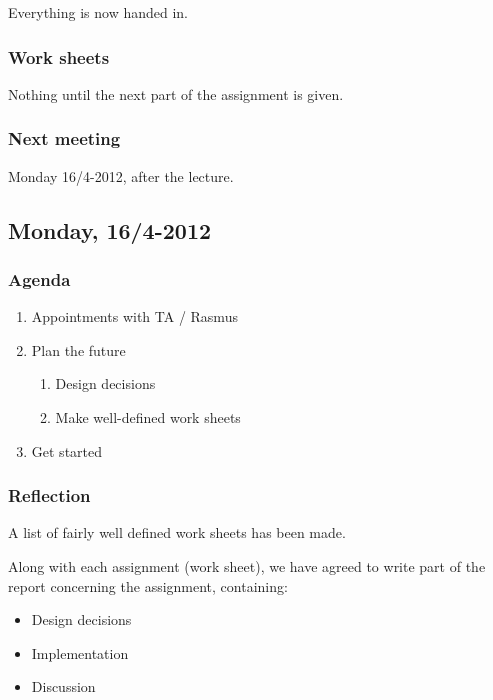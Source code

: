 \documentclass[a4paper,11pt]{article}
\begin{document}
Everything is now handed in.

\subsubsection*{Work sheets}
Nothing until the next part of the assignment is given.

\subsubsection*{Next meeting}
Monday 16/4-2012, after the lecture.


\pagebreak
\subsection{Monday, 16/4-2012}

\subsubsection*{Agenda}
\begin{enumerate}
	\item Appointments with TA / Rasmus
	\item Plan the future
	\begin{enumerate}
		\item Design decisions
		\item Make well-defined work sheets
	\end{enumerate}
	\item Get started
\end{enumerate}

\subsubsection*{Reflection}
A list of fairly well defined work sheets has been made.

Along with each assignment (work sheet), we have agreed to write part of the report concerning the assignment, containing:
\begin{itemize}
	\item Design decisions
	\item Implementation
	\item Discussion
\end{itemize}
\end{document}
